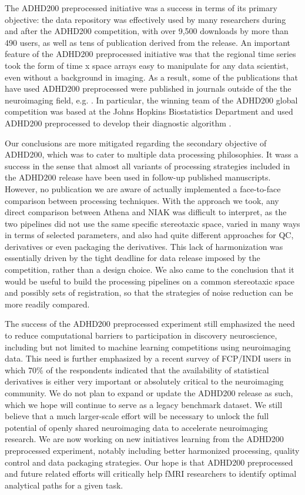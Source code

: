 \documentclass[preprint,12pt,3p]{elsarticle}
\begin{document}
The ADHD200 preprocessed initiative was a success in terms of its primary objective: the data repository was effectively used by many researchers during and after the ADHD200 competition, with over 9,500 downloads by more than 490 users, as well as tens of publication derived from the release. An important feature of the ADHD200 preprocessed initiative was that the regional time series took the form of time x space arrays easy to manipulate for any data scientist, even without a background in imaging. As a result, some of the publications that have used ADHD200 preprocessed were published in journals outside of the the neuroimaging field, e.g. \citep{}. In particular, the winning team of the ADHD200 global competition was based at the Johns Hopkins Biostatistics Department and used ADHD200 preprocessed to develop their diagnostic algorithm \cite{Eloyan2012}.
\par 
Our conclusions are more mitigated regarding the secondary objective of ADHD200, which was to cater to multiple data processing philosophies. It wass a success in the sense that almost all variants of processing strategies included in the ADHD200 release have been used in follow-up published manuscripts. However, no publication we are aware of actually implemented a face-to-face comparison between processing techniques. With the approach we took, any direct comparison between Athena and NIAK was difficult to interpret, as the two pipelines did not use the same specific stereotaxic space, varied in many ways in terms of selected parameters, and also had quite different approaches for QC, derivatives or even packaging the derivatives. This lack of harmonization was essentially driven by the tight deadline for data release imposed by the competition, rather than a design choice. We also came to the conclusion that it would be useful to build the processing pipelines on a common stereotaxic space and possibly sets of registration, so that the strategies of noise reduction can be more readily compared. 
\par 
The success of the ADHD200 preprocessed experiment still emphasized the need to reduce computational barriers to participation in discovery neuroscience, including but not limited to machine learning competitions using neuroimaging data. This need is further emphasized by a recent survey of FCP/INDI users in which 70\% of the respondents indicated that the availability of statistical derivatives is either very important or absolutely critical to the neuroimaging community. We do not plan to expand or update the ADHD200 release as such, which we hope will continue to serve as a legacy benchmark dataset. We still believe that a much larger-scale effort will be necessary to unlock the full potential of openly shared neuroimaging data to accelerate neuroimaging research. We are now working on new initiatives learning from the ADHD200 preprocessed experiment, notably including better harmonized processing, quality control and data packaging strategies. Our hope is that ADHD200 preprocessed and future related efforts will critically help fMRI researchers to identify optimal analytical paths for a given task. 
\end{document}
